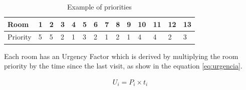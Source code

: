 \documentclass[9pt,journal]{IEEEtran}
\begin{document}
\begin{table}%
\centering
\caption{Example of priorities}
\begin{tabular}{|l|l|l|l|l|l|l|l|l|l|l|l|l|l|}
\hline
Room & 1 & 2 & 3 & 4 & 5 & 6 & 7 & 8 & 9 & 10 & 11 & 12 & 13 \\ 
\hline
Priority & 5 & 5 & 2 & 1 & 3 & 2 & 1 & 2 & 1 & 4 & 4 & 2 & 3 \\ 
\hline
\end{tabular}
\label{tab:exemplo}
\end{table}

Each room has an Urgency Factor which is derived by multiplying the room priority by the time since the last visit, as show in the equation \ref{eq:urgencia}.

\begin{eqnarray}
U_i= P_i \times t_i
\label{eq:urgencia}
\end{eqnarray}









	
	
\end{document}
